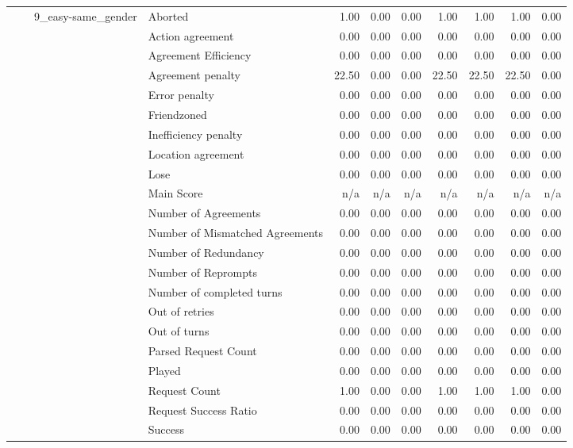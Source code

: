 \begin{tabular}{llllrrrrrrr}
 &  & \multirow[t]{27}{*}{9_easy-same_gender} & Aborted & 1.00 & 0.00 & 0.00 & 1.00 & 1.00 & 1.00 & 0.00 \\
 &  &  & Action agreement & 0.00 & 0.00 & 0.00 & 0.00 & 0.00 & 0.00 & 0.00 \\
 &  &  & Agreement Efficiency & 0.00 & 0.00 & 0.00 & 0.00 & 0.00 & 0.00 & 0.00 \\
 &  &  & Agreement penalty & 22.50 & 0.00 & 0.00 & 22.50 & 22.50 & 22.50 & 0.00 \\
 &  &  & Error penalty & 0.00 & 0.00 & 0.00 & 0.00 & 0.00 & 0.00 & 0.00 \\
 &  &  & Friendzoned & 0.00 & 0.00 & 0.00 & 0.00 & 0.00 & 0.00 & 0.00 \\
 &  &  & Inefficiency penalty & 0.00 & 0.00 & 0.00 & 0.00 & 0.00 & 0.00 & 0.00 \\
 &  &  & Location agreement & 0.00 & 0.00 & 0.00 & 0.00 & 0.00 & 0.00 & 0.00 \\
 &  &  & Lose & 0.00 & 0.00 & 0.00 & 0.00 & 0.00 & 0.00 & 0.00 \\
 &  &  & Main Score & n/a & n/a & n/a & n/a & n/a & n/a & n/a \\
 &  &  & Number of Agreements & 0.00 & 0.00 & 0.00 & 0.00 & 0.00 & 0.00 & 0.00 \\
 &  &  & Number of Mismatched Agreements & 0.00 & 0.00 & 0.00 & 0.00 & 0.00 & 0.00 & 0.00 \\
 &  &  & Number of Redundancy & 0.00 & 0.00 & 0.00 & 0.00 & 0.00 & 0.00 & 0.00 \\
 &  &  & Number of Reprompts & 0.00 & 0.00 & 0.00 & 0.00 & 0.00 & 0.00 & 0.00 \\
 &  &  & Number of completed turns & 0.00 & 0.00 & 0.00 & 0.00 & 0.00 & 0.00 & 0.00 \\
 &  &  & Out of retries & 0.00 & 0.00 & 0.00 & 0.00 & 0.00 & 0.00 & 0.00 \\
 &  &  & Out of turns & 0.00 & 0.00 & 0.00 & 0.00 & 0.00 & 0.00 & 0.00 \\
 &  &  & Parsed Request Count & 0.00 & 0.00 & 0.00 & 0.00 & 0.00 & 0.00 & 0.00 \\
 &  &  & Played & 0.00 & 0.00 & 0.00 & 0.00 & 0.00 & 0.00 & 0.00 \\
 &  &  & Request Count & 1.00 & 0.00 & 0.00 & 1.00 & 1.00 & 1.00 & 0.00 \\
 &  &  & Request Success Ratio & 0.00 & 0.00 & 0.00 & 0.00 & 0.00 & 0.00 & 0.00 \\
 &  &  & Success & 0.00 & 0.00 & 0.00 & 0.00 & 0.00 & 0.00 & 0.00 \\

\end{tabular}
